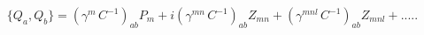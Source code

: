 \begin{equation}\label{1}
\{ Q_a ,Q_b \}=(\gamma^m\,C^{-1})_{ab}P_{m}+i(\gamma^{mn}\,C^{-1})_{ab}Z_{mn}+
(\gamma^{mnl}\,C^{-1})_{ab}Z_{mnl}+.....
\end{equation} 
